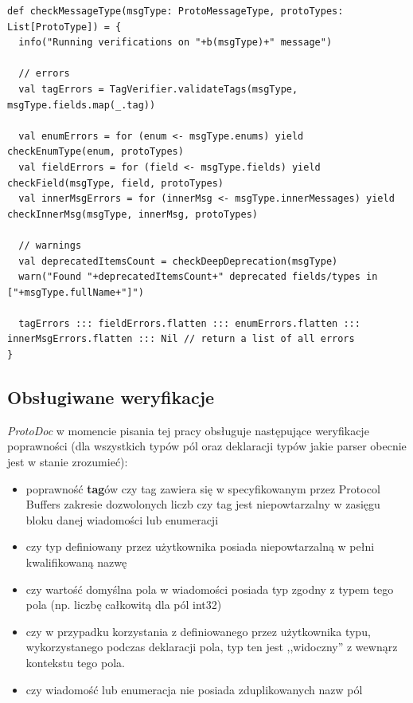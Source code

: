 \documentclass[pdflatex,11pt]{aghdpl}
\begin{document}
\begin{lstlisting}
def checkMessageType(msgType: ProtoMessageType, protoTypes: List[ProtoType]) = {
  info("Running verifications on "+b(msgType)+" message")

  // errors 
  val tagErrors = TagVerifier.validateTags(msgType, msgType.fields.map(_.tag))

  val enumErrors = for (enum <- msgType.enums) yield checkEnumType(enum, protoTypes)
  val fieldErrors = for (field <- msgType.fields) yield checkField(msgType, field, protoTypes)
  val innerMsgErrors = for (innerMsg <- msgType.innerMessages) yield checkInnerMsg(msgType, innerMsg, protoTypes)

  // warnings 
  val deprecatedItemsCount = checkDeepDeprecation(msgType)
  warn("Found "+deprecatedItemsCount+" deprecated fields/types in ["+msgType.fullName+"]")

  tagErrors ::: fieldErrors.flatten ::: enumErrors.flatten ::: innerMsgErrors.flatten ::: Nil // return a list of all errors
}
\end{lstlisting}


\subsection{Obsługiwane weryfikacje}
\textit{ProtoDoc} w momencie pisania tej pracy obsługuje następujące weryfikacje poprawności (dla wszystkich typów pól oraz deklaracji typów jakie parser obecnie 
jest w stanie zrozumieć):

\begin{itemize}
 \item poprawność \textbf{tag}ów
  \subitem czy tag zawiera się w specyfikowanym przez Protocol Buffers zakresie dozwolonych liczb
  \subitem czy tag jest niepowtarzalny w zasięgu bloku danej wiadomości lub enumeracji
 \item czy typ definiowany przez użytkownika posiada niepowtarzalną w pełni kwalifikowaną nazwę
 \item czy wartość domyślna pola w wiadomości posiada typ zgodny z typem tego pola (np. liczbę całkowitą dla pól int32)
 \item czy w przypadku korzystania z definiowanego przez użytkownika typu, wykorzystanego podczas deklaracji pola, typ ten jest ,,widoczny'' 
       z wewnąrz kontekstu tego pola.
 \item czy wiadomość lub enumeracja nie posiada zduplikowanych nazw pól
\end{itemize}
\end{document}
